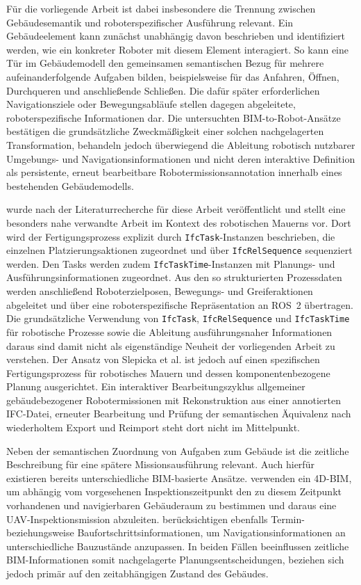 Für die vorliegende Arbeit ist dabei insbesondere die Trennung zwischen Gebäudesemantik und
roboterspezifischer Ausführung relevant. Ein Gebäudeelement kann zunächst unabhängig davon
beschrieben und identifiziert werden, wie ein konkreter Roboter mit diesem Element interagiert. So
kann eine Tür im Gebäudemodell den gemeinsamen semantischen Bezug für mehrere aufeinanderfolgende
Aufgaben bilden, beispielsweise für das Anfahren, Öffnen, Durchqueren und anschließende Schließen.
Die dafür später erforderlichen Navigationsziele oder Bewegungsabläufe stellen dagegen abgeleitete,
roboterspezifische Informationen dar. Die untersuchten BIM-to-Robot-Ansätze bestätigen die
grundsätzliche Zweckmäßigkeit einer solchen nachgelagerten Transformation, behandeln jedoch
überwiegend die Ableitung robotisch nutzbarer Umgebungs- und Navigationsinformationen und nicht
deren interaktive Definition als persistente, erneut bearbeitbare Robotermissionsannotation
innerhalb eines bestehenden Gebäudemodells.

 \textcite{slepicka2026fim} wurde nach der Literaturrecherche für diese Arbeit veröffentlicht und
stellt eine besonders nahe verwandte Arbeit im Kontext des robotischen Mauerns vor. Dort wird der
Fertigungsprozess explizit durch \texttt{IfcTask}-Instanzen beschrieben, die einzelnen
Platzierungsaktionen zugeordnet und über \texttt{IfcRelSequence} sequenziert werden. Den Tasks
werden zudem \texttt{IfcTaskTime}-Instanzen mit Planungs- und Ausführungsinformationen zugeordnet.
Aus den so strukturierten Prozessdaten werden anschließend Roboterzielposen, Bewegungs- und
Greiferaktionen abgeleitet und über eine roboterspezifische Repräsentation an ROS~2 übertragen. Die
grundsätzliche Verwendung von \texttt{IfcTask}, \texttt{IfcRelSequence} und \texttt{IfcTaskTime} für
robotische Prozesse sowie die Ableitung ausführungsnaher Informationen daraus sind damit nicht als
eigenständige Neuheit der vorliegenden Arbeit zu verstehen. Der Ansatz von Slepicka et al. ist
jedoch auf einen spezifischen Fertigungsprozess für robotisches Mauern und dessen
komponentenbezogene Planung ausgerichtet. Ein interaktiver Bearbeitungszyklus allgemeiner
gebäudebezogener Robotermissionen mit Rekonstruktion aus einer annotierten IFC-Datei, erneuter
Bearbeitung und Prüfung der semantischen Äquivalenz nach wiederholtem Export und Reimport steht dort
nicht im Mittelpunkt.

Neben der semantischen Zuordnung von Aufgaben zum Gebäude ist die zeitliche Beschreibung für eine
spätere Missionsausführung relevant. Auch hierfür existieren bereits unterschiedliche BIM-basierte
Ansätze. \textcite{hamledari2021automation} verwenden ein 4D-BIM, um abhängig vom vorgesehenen
Inspektionszeitpunkt den zu diesem Zeitpunkt vorhandenen und navigierbaren Gebäuderaum zu bestimmen
und daraus eine UAV-Inspektionsmission abzuleiten. \textcite{gopee2023improving} berücksichtigen
ebenfalls Termin- beziehungsweise Baufortschrittsinformationen, um Navigationsinformationen an
unterschiedliche Bauzustände anzupassen. In beiden Fällen beeinflussen zeitliche BIM-Informationen
somit nachgelagerte Planungsentscheidungen, beziehen sich jedoch primär auf den zeitabhängigen
Zustand des Gebäudes.

